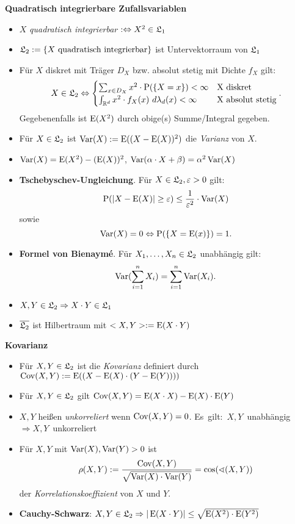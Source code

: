 \textbf{Quadratisch integrierbare Zufallsvariablen}
\begin{itemize}
\item $X$ \textit{quadratisch integrierbar} $:\Leftrightarrow X^2\in\mathfrak{L}_1$

\item $\mathfrak{L}_2:=\{X \text{ quadratisch integrierbar}\}$ ist Untervektorraum von $\mathfrak{L}_1$

\item Für $X$ diskret mit Träger $D_X$ bzw. absolut stetig mit Dichte $f_X$ gilt:
\[
	X\in\mathfrak{L}_2\Leftrightarrow
	\begin{cases}
	\sum_{x\in D_X} x^2\cdot\operatorname{P}(\{X=x\})<\infty			& \text{X diskret} \\
	\int_{\mathbb{R}^d} x^2\cdot f_X(x)~d\lambda_d(x)<\infty		& \text{X absolut stetig}
	\end{cases}.
\]
Gegebenenfalls ist $\operatorname{E}(X^2)$ durch obige(s) Summe/Integral gegeben.

\item Für $X\in\mathfrak{L}_2$ ist $\operatorname{Var}(X):=\operatorname{E}((X-\operatorname{E}(X))^2)$ die \textit{Varianz} von $X$.

\item $\operatorname{Var}(X)=\operatorname{E}(X^2)-(\operatorname{E}(X))^2$, \quad $\operatorname{Var}(\alpha\cdot X+\beta)=\alpha^2\operatorname{Var}(X)$

\item \textbf{Tschebyschev-Ungleichung}. Für $X\in\mathfrak{L}_2, \varepsilon>0$ gilt:
\[
	\operatorname{P}(|X-\operatorname{E}(X)|\geq \varepsilon)\leq \frac{1}{\varepsilon^2}\cdot\operatorname{Var}(X)
\]
sowie
\[
	\operatorname{Var}(X)=0 \Leftrightarrow \operatorname{P}(\{X=\operatorname{E}(x)\})=1.
\]

\item \textbf{Formel von Bienaymé}. Für $X_1,\ldots,X_n\in\mathfrak{L}_2$ unabhängig gilt:
\[
	\operatorname{Var}(\sum_{i=1}^n X_i) = \sum_{i=1}^n\operatorname{Var}(X_i).
\]

\item $X,Y\in\mathfrak{L}_2\Rightarrow X\cdot Y\in\mathfrak{L}_1$

\item $\overline{\mathfrak{L}_2}$ ist Hilbertraum mit $<X,Y>:=\operatorname{E}(X\cdot Y)$
\end{itemize}
\hspace{3em}

\textbf{Kovarianz}
\begin{itemize}
\item Für $X,Y\in\mathfrak{L}_2$ ist die \textit{Kovarianz} definiert durch
\mbox{$\operatorname{Cov}(X,Y):=\operatorname{E}((X-\operatorname{E}(X)\cdot (Y-\operatorname{E}(Y))))$}

\item Für $X,Y\in\mathfrak{L}_2$ gilt $\operatorname{Cov}(X,Y)=\operatorname{E}(X\cdot X)-\operatorname{E}(X)\cdot\operatorname{E}(Y)$

\item $X,Y$ heißen \textit{unkorreliert} wenn $\operatorname{Cov}(X,Y)=0$.
\mbox{Es gilt: $X,Y$ unabhängig $\Rightarrow X,Y$ unkorreliert}

\item Für $X,Y$ mit $\operatorname{Var}(X),\operatorname{Var}(Y)>0$ ist
\[
	\rho(X,Y):=\frac{\operatorname{Cov}(X,Y)}{\sqrt{\operatorname{Var}(X)\cdot\operatorname{Var}(Y)}} = 
	\cos(\sphericalangle (X,Y))
\]
der \textit{Korrelationskoeffizient} von $X$ und $Y$.

\item \textbf{Cauchy-Schwarz}: $X,Y\in\mathfrak{L}_2
\Rightarrow |\operatorname{E}(X\cdot Y)|\leq \sqrt{\operatorname{E}(X^2)\cdot\operatorname{E}(Y^2)}$
\end{itemize}

